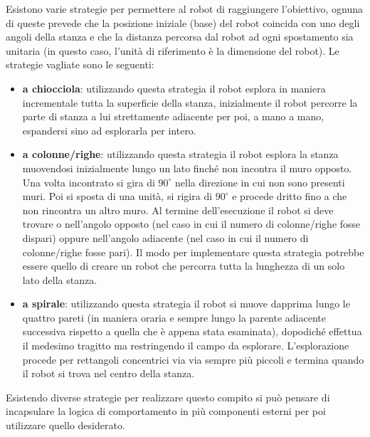 Esistono varie strategie per permettere al robot di raggiungere l'obiettivo, ognuna di queste prevede che la posizione iniziale (base) del robot coincida con uno degli angoli della stanza e che la distanza percorsa dal robot ad ogni spostamento sia unitaria (in questo caso, l'unità di riferimento è la dimensione del robot). Le strategie vagliate sono le seguenti:
\begin{itemize}
    \item \textbf{a chiocciola}: utilizzando questa strategia il robot esplora in maniera incrementale tutta la superficie della stanza, inizialmente il robot percorre la parte di stanza a lui strettamente adiacente per poi, a mano a mano, espandersi sino ad esplorarla per intero.
    
    \item \textbf{a colonne/righe}: utilizzando questa strategia il robot esplora la stanza muovendosi inizialmente lungo un lato finché non incontra il muro opposto. Una volta incontrato si gira di $90^\circ$ nella direzione in cui non sono presenti muri. Poi si sposta di una unità, si rigira di  $90^\circ$ e procede dritto fino a che non rincontra un altro muro. 
    Al termine dell'esecuzione il robot si deve trovare o nell'angolo opposto (nel caso in cui il numero di colonne/righe fosse dispari) oppure nell'angolo adiacente (nel caso in cui il numero di colonne/righe fosse pari).
    Il modo per implementare questa strategia potrebbe essere quello di creare un robot che percorra tutta la lunghezza di un solo lato della stanza.
    
    \item \textbf{a spirale}: utilizzando questa strategia il robot si muove dapprima lungo le quattro pareti (in maniera oraria e sempre lungo la parente adiacente successiva rispetto a quella che è appena stata esaminata), dopodiché effettua il medesimo tragitto ma restringendo il campo da esplorare. L'esplorazione procede per rettangoli concentrici via via sempre più piccoli e termina quando il robot si trova nel centro della stanza.
\end{itemize}

Esistendo diverse strategie per realizzare questo compito si può pensare di incapsulare la logica di comportamento in più componenti esterni per poi utilizzare quello desiderato.


